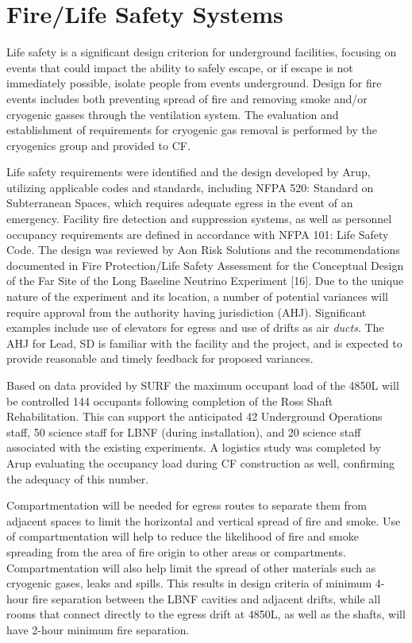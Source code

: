 \section{Fire/Life Safety Systems }
\label{sec:fscf-und-fire}

Life safety is a significant design criterion for underground facilities, focusing on events that could impact the ability to safely escape, or if escape is not immediately possible, isolate people from events underground. Design for fire events includes both preventing spread of fire and removing smoke and/or cryogenic gasses through the ventilation system. The evaluation and establishment of requirements for cryogenic gas removal is performed by the cryogenics group and provided to CF.

Life safety requirements were identified and the design developed by Arup, utilizing applicable codes and standards, including NFPA 520: Standard on Subterranean Spaces, which requires adequate egress in the event of an emergency. Facility fire detection and suppression systems, as well as personnel occupancy requirements are defined in accordance with NFPA 101: Life Safety Code. The design was reviewed by Aon Risk Solutions and the recommendations documented in Fire Protection/Life Safety Assessment for the Conceptual Design of the Far Site of the Long Baseline Neutrino Experiment [16]. Due to the unique nature of the experiment and its location, a number of potential variances will require approval from the authority having jurisdiction (AHJ). Significant examples include use of elevators for egress and use of drifts as air \textit{ducts}. The AHJ for Lead, SD is familiar with the facility and the project, and is expected to provide reasonable and timely feedback for proposed variances.  

Based on data provided by SURF the maximum occupant load of the 4850L will be controlled 144 occupants following completion of the Ross Shaft Rehabilitation. This can support the anticipated 42 Underground Operations staff, 50 science staff for LBNF (during installation), and 20 science staff associated with the existing experiments. A logistics study\cite{lbnf-logistics} was completed by Arup evaluating the occupancy load during CF construction as well, confirming the adequacy of this number.

Compartmentation will be needed for egress routes to separate them from adjacent spaces to limit the horizontal and vertical spread of fire and smoke. Use of compartmentation will help to reduce the likelihood of fire and smoke spreading from the area of fire origin to other areas or compartments. Compartmentation will also help limit the spread of other materials such as cryogenic gases, leaks and spills. This results in design criteria of minimum 4-hour fire separation between the LBNF cavities and adjacent drifts, while all rooms that connect directly to the egress drift at 4850L, as well as the shafts, will have 2-hour minimum fire separation.

